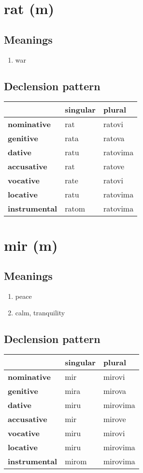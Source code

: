 \filbreak
\section{rat (m)}
\subsection*{Meanings}
\begin{enumerate}
\item war
\end{enumerate}
\subsection*{Declension pattern}
\begin{tabularx}{\linewidth}{Xll}
\toprule
{} & singular &    plural \\
\midrule
\textbf{nominative  } &      rat &    ratovi \\
\textbf{genitive    } &     rata &    ratova \\
\textbf{dative      } &     ratu &  ratovima \\
\textbf{accusative  } &      rat &    ratove \\
\textbf{vocative    } &     rate &    ratovi \\
\textbf{locative    } &     ratu &  ratovima \\
\textbf{instrumental} &    ratom &  ratovima \\
\bottomrule
\end{tabularx}

\filbreak
\section{mir (m)}
\subsection*{Meanings}
\begin{enumerate}
\item peace
\item calm, tranquility
\end{enumerate}
\subsection*{Declension pattern}
\begin{tabularx}{\linewidth}{Xll}
\toprule
{} & singular &    plural \\
\midrule
\textbf{nominative  } &      mir &    mirovi \\
\textbf{genitive    } &     mira &    mirova \\
\textbf{dative      } &     miru &  mirovima \\
\textbf{accusative  } &      mir &    mirove \\
\textbf{vocative    } &     miru &    mirovi \\
\textbf{locative    } &     miru &  mirovima \\
\textbf{instrumental} &    mirom &  mirovima \\
\bottomrule
\end{tabularx}


